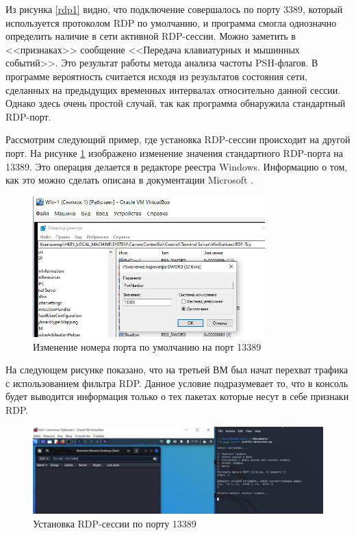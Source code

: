 \documentclass[bachelor, och, coursework]{SCWorks}
\begin{document}
Из рисунка \ref{rdp1} видно, что подключение совершалось по порту 3389, который используется протоколом RDP по умолчанию, и 
программа смогла однозначно определить наличие в сети активной RDP-сессии. Можно заметить в <<признаках>> сообщение <<Передача клавиатурных и
мышинных событий>>. Это результат работы метода анализа частоты PSH-флагов. В программе вероятность считается исходя из результатов состояния сети,
сделанных на предыдущих временных интервалах относительно данной сессии. Однако здесь очень простой случай, так как программа обнаружила стандартный
RDP-порт. 

Рассмотрим следующий пример, где установка RDP-сессии происходит на другой порт. На рисунке \ref{rdpport1} изображено изменение
значения стандартного RDP-порта на 13389. Это операция делается в редакторе реестра Windows. Информацию о том, как это можно сделать
описана в документации Microsoft \cite{rdpport}.


\begin{figure}[H]
  \centering
  \includegraphics[width=0.8\textwidth]{photo/rdpport1.jpg}
  \caption{Изменение номера порта по умолчанию на порт 13389}
  \label{rdpport1}
\end{figure}

На следующем рисунке показано, что на третьей ВМ был начат перехват трафика с использованием фильтра RDP. Данное условие подразумевает то,
что в консоль будет выводится информация только о тех пакетах которые несут в себе признаки RDP.

\begin{figure}[H]
  \centering
  \includegraphics[width=1\textwidth]{photo/rdpport2.jpg}
  \caption{Установка RDP-сессии по порту 13389}
  \label{rdpport2}
\end{figure}
\end{document}
